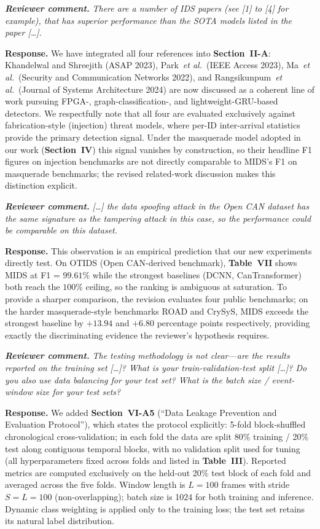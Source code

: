 \documentclass[11pt,a4paper]{article}
\newcommand{\rcomment}[1]{%
  \par\medskip
  \begingroup
  \itshape
  \textbf{Reviewer comment.}\,\,#1
  \endgroup
  \par
}
\newcommand{\rresponse}[1]{%
  \par
  \begingroup
  \color{NavyBlue}
  \textbf{Response.}\,\,#1
  \endgroup
  \par\medskip
}
\newcommand{\xref}[1]{\textbf{#1}}
\begin{document}
\rcomment{There are a number of IDS papers (see [1] to [4] for
example), that has superior performance than the SOTA models
listed in the paper [\dots].}
\rresponse{We have integrated all four references into
\xref{Section~II-A}: Khandelwal and Shreejith (ASAP 2023),
Park~\textit{et al.}\ (IEEE Access 2023),
Ma~\textit{et al.}\ (Security and Communication Networks 2022), and
Rangsikunpum~\textit{et al.}\ (Journal of Systems Architecture 2024)
are now discussed as a
coherent line of work pursuing FPGA-, graph-classification-, and
lightweight-GRU-based detectors. We respectfully note that all
four are evaluated exclusively against fabrication-style
(injection) threat models, where per-ID inter-arrival statistics
provide the primary detection signal. Under the masquerade model
adopted in our work (\xref{Section~IV}) this signal vanishes by
construction, so their headline F1 figures on injection
benchmarks are not directly comparable to MIDS's F1 on
masquerade benchmarks; the revised related-work discussion makes
this distinction explicit.}

\rcomment{[\dots] the data spoofing attack in the Open CAN dataset
has the same signature as the tampering attack in this case, so
the performance could be comparable on this dataset.}
\rresponse{This observation is an empirical prediction that our
new experiments directly test. On OTIDS (Open CAN-derived
benchmark), \xref{Table~VII} shows MIDS at F1 = $99.61\%$ while
the strongest baselines (DCNN, CanTransformer) both reach the
$100\%$ ceiling, so the ranking is ambiguous at saturation. To
provide a sharper comparison, the revision evaluates four public
benchmarks; on the harder masquerade-style benchmarks ROAD and
CrySyS, MIDS exceeds the strongest baseline by $+13.94$ and
$+6.80$ percentage points respectively, providing exactly the
discriminating evidence the reviewer's hypothesis requires.}

\rcomment{The testing methodology is not clear---are the results
reported on the training set [\dots]? What is your
train-validation-test split [\dots]? Do you also use data balancing
for your test set? What is the batch size / event-window size for
your test sets?}
\rresponse{We added \xref{Section~VI-A5} (``Data Leakage Prevention
and Evaluation Protocol''), which states the protocol explicitly:
5-fold block-shuffled chronological cross-validation; in each
fold the data are split 80\% training / 20\% test along contiguous
temporal blocks, with no validation split used for tuning (all
hyperparameters fixed across folds and listed in
\xref{Table~III}). Reported metrics are computed exclusively on
the held-out 20\% test block of each fold and averaged across the
five folds. Window length is $L=100$ frames with stride $S=L=100$
(non-overlapping); batch size is 1024 for both training and
inference. Dynamic class weighting is applied only to the
training loss; the test set retains its natural label
distribution.}
\end{document}
